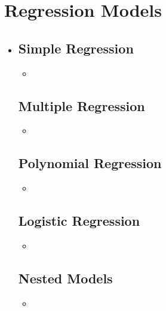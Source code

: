 \section{Regression Models}
\begin{itemize}
  \item [] 
  
  \subsection{Simple Regression}
  \begin{itemize}
    \item 
  \end{itemize}
  
  \subsection{Multiple Regression}
  \begin{itemize}
    \item 
  \end{itemize}
  
  \subsection{Polynomial Regression}
  \begin{itemize}
    \item 
  \end{itemize}
  
  \subsection{Logistic Regression}
  \begin{itemize}
    \item 
  \end{itemize}

  \subsection{Nested Models}
  \begin{itemize}
    \item 
  \end{itemize}
  
\end{itemize}

